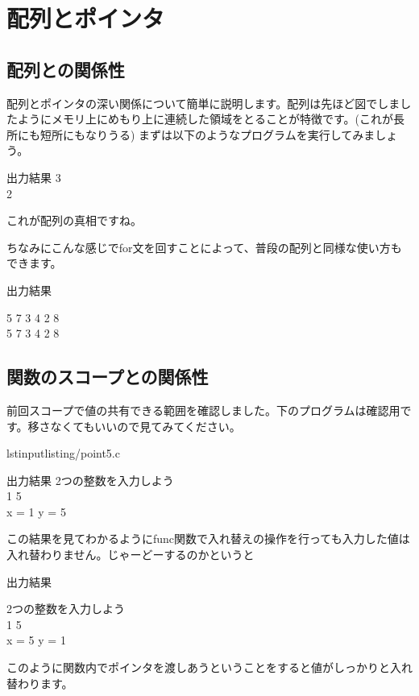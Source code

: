 ﻿\section{配列とポインタ}

\subsection{配列との関係性}
配列とポインタの深い関係について簡単に説明します。配列は先ほど図でしましたようにメモリ上にめもり上に連続した領域をとることが特徴です。(これが長所にも短所にもなりうる)
まずは以下のようなプログラムを実行してみましょう。



\begin{itembox}{出力結果}
3\\
2

\end{itembox}
これが配列の真相ですね。

ちなみにこんな感じでfor文を回すことによって、普段の配列と同様な使い方もできます。


\begin{itembox}{出力結果}

5 7 3 4 2 8\\
5 7 3 4 2 8
\end{itembox}

\subsection{関数のスコープとの関係性}
前回スコープで値の共有できる範囲を確認しました。下のプログラムは確認用です。移さなくてもいいので見てみてください。

lstinputlisting{\codepath/point5.c}

\begin{itembox}{出力結果}
2つの整数を入力しよう\\
1 5\\
x = 1 y = 5

\end{itembox}
この結果を見てわかるようにfunc関数で入れ替えの操作を行っても入力した値は入れ替わりません。じゃーどーするのかというと



\begin{itembox}{出力結果}

2つの整数を入力しよう\\
1 5\\
x = 5 y = 1
\end{itembox}
このように関数内でポインタを渡しあうということをすると値がしっかりと入れ替わります。

